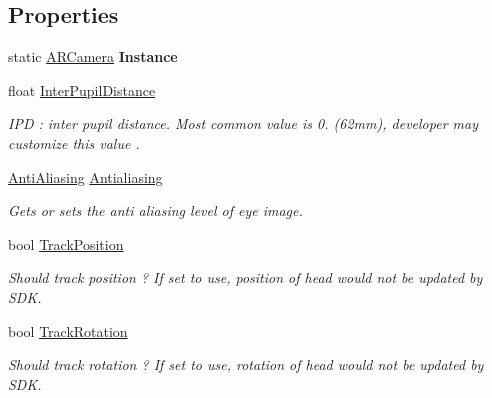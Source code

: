 \subsection*{Properties}
\begin{DoxyCompactItemize}
\item 
\mbox{\label{class_ximmerse_1_1_rhino_x_1_1_a_r_camera_a2a7a6add621976cabf2958ea01f652fd}} 
static \mbox{\hyperlink{class_ximmerse_1_1_rhino_x_1_1_a_r_camera}{A\+R\+Camera}} {\bfseries Instance}
\item 
float \mbox{\hyperlink{class_ximmerse_1_1_rhino_x_1_1_a_r_camera_a83ddafe725c4738c84b292501ea9e55f}{Inter\+Pupil\+Distance}}
\begin{DoxyCompactList}\small\item\em I\+PD \+: inter pupil distance. Most common value is 0. (62mm), developer may customize this value . \end{DoxyCompactList}\item 
\mbox{\hyperlink{namespace_ximmerse_1_1_rhino_x_a6f6b7e0f3b580e31040b75578bbf4c94}{Anti\+Aliasing}} \mbox{\hyperlink{class_ximmerse_1_1_rhino_x_1_1_a_r_camera_ae64077302d7071482e8242b754af8af4}{Antialiasing}}
\begin{DoxyCompactList}\small\item\em Gets or sets the anti aliasing level of eye image. \end{DoxyCompactList}\item 
bool \mbox{\hyperlink{class_ximmerse_1_1_rhino_x_1_1_a_r_camera_a6374e45b33643924d3aa0c3e32360d73}{Track\+Position}}
\begin{DoxyCompactList}\small\item\em Should track position ? If set to use, position of head would not be updated by S\+DK. \end{DoxyCompactList}\item 
bool \mbox{\hyperlink{class_ximmerse_1_1_rhino_x_1_1_a_r_camera_ae2c6be1c7856874b2f66961adb1536ae}{Track\+Rotation}}
\begin{DoxyCompactList}\small\item\em Should track rotation ? If set to use, rotation of head would not be updated by S\+DK. \end{DoxyCompactList}\item 

\end{DoxyCompactItemize}
